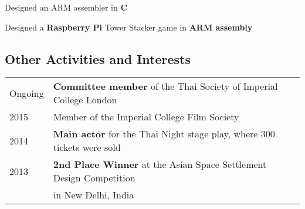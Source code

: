 \documentclass[a4paper]{deedy-resume-openfont}
\begin{document}
\begin{minipage}[t]{0.63\textwidth}
\vskip 0.2cm

\begin{tightemize}
\item {\small Designed an ARM assembler in \textbf{C}}
\item {\small Designed a \textbf{Raspberry Pi} Tower Stacker game in \textbf{ARM assembly}}
\end{tightemize}
\sectionsep

\vskip 0.2cm


\sectionsep


\begin{snugshade}
\section{Other Activities and Interests} 
\end{snugshade}


\begin{tabular}{lll}
\small Ongoing & \small \textbf{Committee member} of the Thai Society of Imperial College London\\
\small 2015   & \small Member of the Imperial College Film Society\\
\small 2014   & \small \textbf{Main actor} for the Thai Night stage play, where 300 tickets were sold \\
\small 2013   & \small \textbf{2nd Place Winner} at the Asian Space Settlement Design Competition\\ 				& \small in New Delhi, India
\end{tabular}
\sectionsep

\end{minipage} 
\end{document}

